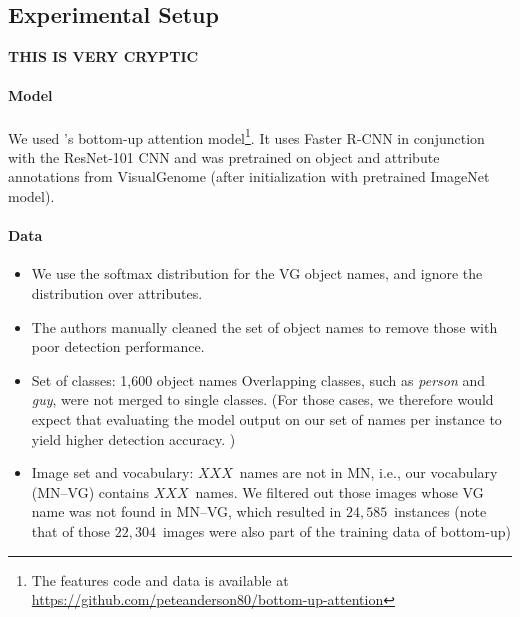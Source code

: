 

\subsection{Experimental Setup}
\textbf{THIS IS VERY CRYPTIC}
\paragraph{Model}
We used \citeauthor{anderson2018updown}'s \citeyear{anderson2018updown} bottom-up attention model\footnote{The features code and data is available at \url{https://github.com/peteanderson80/bottom-up-attention}}. 
It uses Faster R-CNN in conjunction with the ResNet-101 CNN and was pretrained on object and attribute annotations from VisualGenome (after initialization with pretrained ImageNet model).
\iffalse
"To pretrain the bottom-up attention model, we first initialize Faster R-CNN with ResNet-101 pretrained for classification on ImageNet [35]. We then train on Visual
Genome [21] data. To aid the learning of good feature
representations, we add an additional training output for
predicting attribute classes (in addition to object classes).
To predict attributes for region i, we concatenate the mean
pooled convolutional feature vi with a learned embedding
of the ground-truth object class, and feed this into an additional output layer defining a softmax distribution over each
attribute class plus a ‘no attributes’ class.
The original Faster R-CNN multi-task loss function contains four components, defined over the classification and
bounding box regression outputs for both the RPN and the
final object class proposals respectively. We retain these
components and add an additional multi-class loss component to train the attribute predictor"
\fi

\paragraph{Data}
\begin{itemize}
	\item We use the softmax distribution for the VG object names, and ignore the distribution over attributes. 
	\item The authors manually cleaned the set of object names to remove those with poor detection performance.
	\item Set of classes: 1,600 object names
	Overlapping classes, such as \textsl{person} and \textsl{guy}, were not merged to single classes. (For those cases, we therefore would expect that evaluating the model output on our set of names per instance to yield higher detection accuracy. )
	\item Image set and vocabulary: $XXX$~names are not in MN, i.e., our vocabulary (MN--VG) contains $XXX$~names. 
	We filtered out those images whose VG name was not found in MN--VG, which resulted in $24,585$~instances (note that of those $22,304$~images were also part of the training data of bottom-up)
\end{itemize} 

